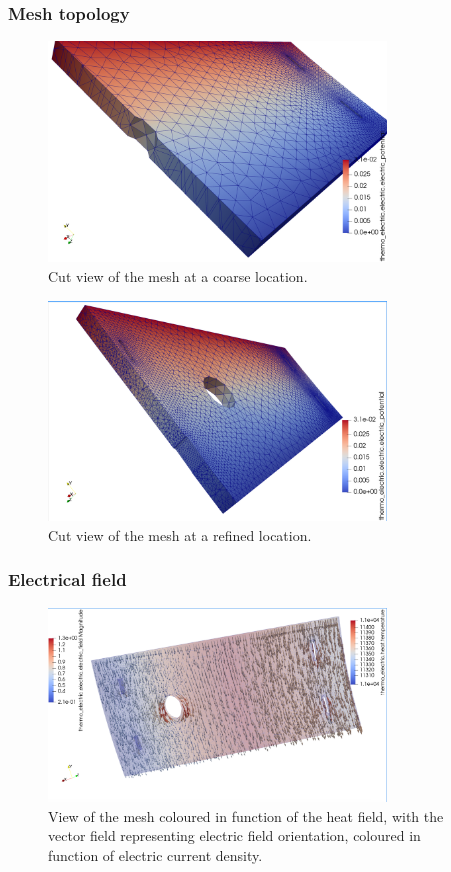 \documentclass[12pt]{article}
\begin{document}
\subsubsection{Mesh topology}
\begin{figure}[H]
  \centering
  \includegraphics[width=0.8\textwidth]{images/grossier.png}
  \caption{Cut view of the mesh at a coarse location.}
\end{figure}

\begin{figure}[H]
  \centering
  \includegraphics[width=0.8\textwidth]{images/raffine.png}
  \caption{Cut view of the mesh at a refined location.}
\end{figure}

\subsubsection{Electrical field}

\begin{figure}[H]
  \centering
  \includegraphics[width=0.8\textwidth]{images/field1.png}
  \caption{View of the mesh coloured in function of the heat field, with the vector field representing electric field orientation, coloured in function of electric current density.}
\end{figure}
\end{document}
